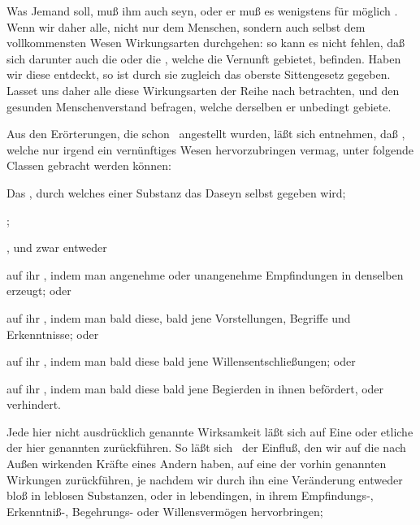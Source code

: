 \begin{aufza}
\item Was Jemand  soll, muß ihm auch  seyn, oder er muß es wenigstens für möglich . Wenn wir daher alle, nicht nur dem Menschen, sondern auch selbst dem vollkommensten Wesen  Wirkungsarten durchgehen: so kann es nicht fehlen, daß sich darunter auch die  oder die , welche die Vernunft  gebietet, befinden. Haben wir diese entdeckt, so ist durch sie zugleich das oberste Sittengesetz gegeben. Lasset uns daher alle diese Wirkungsarten der Reihe nach betrachten, und den gesunden Menschenverstand befragen, welche derselben er unbedingt gebiete.
\item Aus den Erörterungen, die schon \ angestellt wurden, läßt sich entnehmen, daß , welche nur irgend ein vernünftiges Wesen hervorzubringen vermag, unter folgende Classen gebracht werden können:
\begin{aufzb}
\item Das , durch welches einer Substanz das Daseyn selbst gegeben wird;
\item {};
\item {}, und zwar entweder
\begin{aufzc}
\item auf ihr , indem man angenehme oder unangenehme Empfindungen in denselben erzeugt; oder
\item auf ihr , indem man bald diese, bald jene Vorstellungen, Begriffe und Erkenntnisse; oder
\item auf ihr , indem man bald diese bald jene Willensentschließungen; oder
\item auf ihr , indem man bald diese bald jene Begierden in ihnen befördert, oder verhindert.~
\end{aufzc}
Jede hier nicht ausdrücklich genannte Wirksamkeit läßt sich auf Eine oder etliche der hier genannten zurückführen. So läßt sich \zB\ der Einfluß, den wir auf die nach Außen wirkenden Kräfte eines Andern haben, auf eine der vorhin genannten Wirkungen zurückführen, je nachdem wir durch ihn eine Veränderung entweder bloß in leblosen Substanzen, oder in lebendingen, in ihrem Empfindungs-, Erkenntniß-, Begehrungs- oder Willensvermögen hervorbringen; \usw\

\end{aufzb}
\end{aufza}
